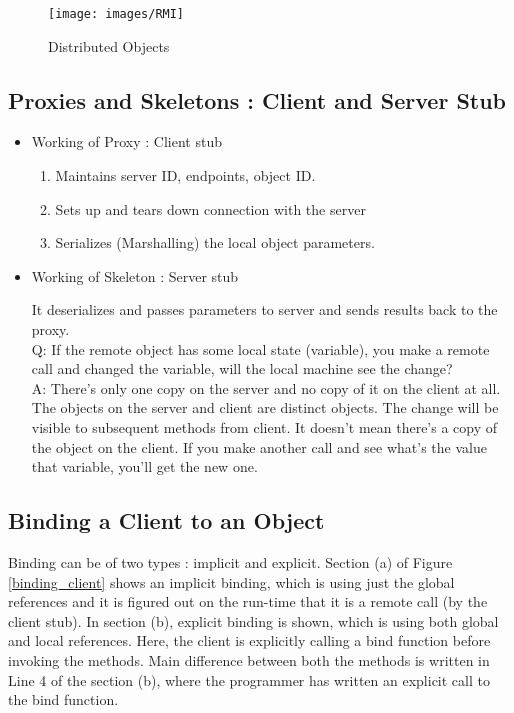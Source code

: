 \documentclass[twoside]{article}
\begin{document}
\begin{figure}[h]
\begin{center}
\texttt{[image: images/RMI]}
\caption{Distributed Objects}
\label{distributed_obj}
\end{center}
\end{figure}

\subsection{Proxies and Skeletons : Client and Server Stub}

\begin{itemize}

\item Working of Proxy : Client stub

\begin{enumerate}
	\item Maintains server ID, endpoints, object ID.
	\item Sets up and tears down connection with the server
	\item Serializes (Marshalling) the local object parameters.
\end{enumerate}

\item Working of Skeleton : Server stub

It deserializes and passes parameters to server and sends results back to the proxy. \\

Q: If the remote object has some local state (variable), you make a remote call and changed the variable, will the local machine see the change?\\
A: There's only one copy on the server and no copy of it on the client at all. The objects on the server and client are distinct objects. The change will be visible to subsequent methods from client. It doesn't mean there's a copy of the object on the client. If you make another call and see what's the value that variable, you'll get the new one.

\end{itemize}

\subsection{Binding a Client to an Object}

Binding can be of two types : implicit and explicit. Section (a) of Figure \ref{binding_client} shows an implicit binding, which is using just the global references and it is figured out on the run-time that it is a remote call (by the client stub). In section (b), explicit binding is shown, which is using both global and local references. Here, the client is explicitly calling a bind function before invoking the methods.  Main difference between both the methods is written in Line 4 of the section (b), where the programmer has written an explicit call to the bind function.
\end{document}
